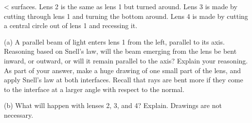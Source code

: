 <%
surfaces. Lens 2 is the same as lens 1 but turned around.
Lens 3 is made by cutting through lens 1 and turning the
bottom around. Lens 4 is made by cutting a central circle
out of lens 1 and recessing it.

(a) A parallel beam of light enters lens 1 from the left,
parallel to its axis. Reasoning based on Snell's law, will
the beam emerging from the lens be bent inward, or outward,
or will it remain parallel to the axis? Explain your
reasoning. As part of your answer, make a huge
drawing of one small part of the lens, and apply Snell's law
at both interfaces. Recall that rays are bent more if they
come to the interface at a larger angle with respect to the normal.

(b) What will happen with lenses 2, 3, and 4? Explain.
Drawings are not necessary.
